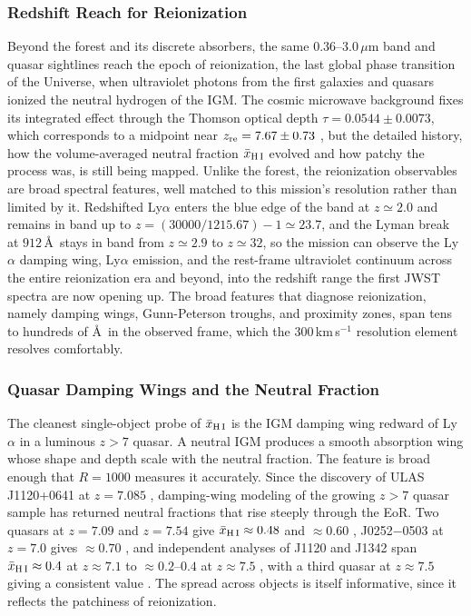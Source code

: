 \documentclass[10pt,onecolumn]{article}
\begin{document}
\subsubsection{Redshift Reach for Reionization}

Beyond the forest and its discrete absorbers, the same $0.36$--$3.0\,\mu$m band and quasar sightlines reach the epoch of reionization, the last global phase transition of the Universe, when ultraviolet photons from the first galaxies and quasars ionized the neutral hydrogen of the IGM. The cosmic microwave background fixes its integrated effect through the Thomson optical depth $\tau=0.0544\pm0.0073$, which corresponds to a midpoint near $z_{\rm re}=7.67\pm0.73$ \cite{planck2018}, but the detailed history, how the volume-averaged neutral fraction $\bar{x}_{\rm H\,I}$ evolved and how patchy the process was, is still being mapped. Unlike the forest, the reionization observables are broad spectral features, well matched to this mission's resolution rather than limited by it. Redshifted Ly$\alpha$ enters the blue edge of the band at $z\simeq2.0$ and remains in band up to $z=(30000/1215.67)-1\simeq23.7$, and the Lyman break at $912$\,\AA\ stays in band from $z\simeq2.9$ to $z\simeq32$, so the mission can observe the Ly$\alpha$ damping wing, Ly$\alpha$ emission, and the rest-frame ultraviolet continuum across the entire reionization era and beyond, into the redshift range the first JWST spectra are now opening up. The broad features that diagnose reionization, namely damping wings, Gunn-Peterson troughs, and proximity zones, span tens to hundreds of \AA\ in the observed frame, which the $300$\,km\,s$^{-1}$ resolution element resolves comfortably.

\subsubsection{Quasar Damping Wings and the Neutral Fraction}

The cleanest single-object probe of $\bar{x}_{\rm H\,I}$ is the IGM damping wing redward of Ly$\alpha$ in a luminous $z>7$ quasar. A neutral IGM produces a smooth absorption wing whose shape and depth scale with the neutral fraction. The feature is broad enough that $R=1000$ measures it accurately. Since the discovery of ULAS\,J1120+0641 at $z=7.085$ \cite{mortlock2011}, damping-wing modeling of the growing $z>7$ quasar sample has returned neutral fractions that rise steeply through the EoR. Two quasars at $z=7.09$ and $z=7.54$ give $\bar{x}_{\rm H\,I}\approx0.48$ and $\approx0.60$ \cite{davies2018}, J0252$-$0503 at $z=7.0$ gives $\approx0.70$ \cite{wang2020}, and independent analyses of J1120 and J1342 span $\bar{x}_{\rm H\,I}\approx0.4$ at $z\approx7.1$ to $\approx0.2$--$0.4$ at $z\approx7.5$ \cite{greig2017,greig2019}, with a third quasar at $z\approx7.5$ giving a consistent value \cite{yang2020}. The spread across objects is itself informative, since it reflects the patchiness of reionization.
\end{document}
